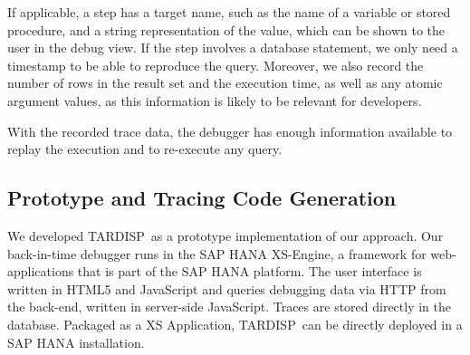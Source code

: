 \documentclass[english,conference]{IEEEtran}
\newcommand{\todo}[2][]{\pdfmargincomment[author={#1}]{#2}}
\newcommand{\tool}{TAR\-DISP}
\begin{document}
If applicable, a step has a target name, such as the name of a variable or stored procedure, and a string representation of the value, which can be shown to the user in the debug view.
If the step involves a database statement, we only need a timestamp to be able to reproduce the query.
Moreover, we also record the number of rows in the result set and the execution time, as well as any atomic argument values, as this information is likely to be relevant for developers.



With the recorded trace data, the debugger has enough information available to replay the execution and to re-execute any query.
%
%
%


\subsection{Prototype and Tracing Code Generation}

We developed \tool\ as a prototype implementation of our approach.
Our back-in-time debugger runs in the SAP HANA XS-Engine, a framework for web-applications that is part of the SAP HANA platform.
The user interface is written in HTML5 and JavaScript and queries debugging data via HTTP from the back-end, written in server-side JavaScript.
Traces are stored directly in the database.
Packaged as a XS Application, \tool\ can be directly deployed in a SAP HANA installation.
\end{document}
